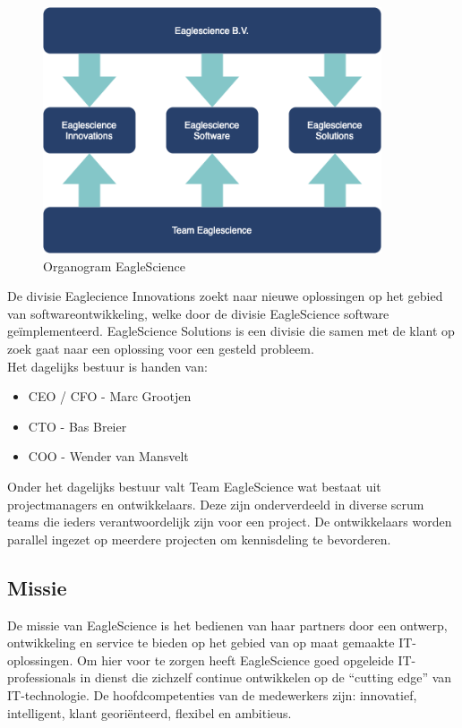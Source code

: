 \begin{figure}[bth]
\myfloatalign
\includegraphics[width=10cm]{gfx/organogram}
\caption{Organogram EagleScience}
\label{fig:EagleScience organogram}
\end{figure}
De divisie Eaglecience Innovations zoekt naar nieuwe oplossingen op het gebied van softwareontwikkeling, welke door de divisie EagleScience software geïmplementeerd. EagleScience Solutions is een divisie die samen met de klant op zoek gaat naar een oplossing voor een gesteld probleem.\\ %
Het dagelijks bestuur is handen van:
\begin{itemize}
\item CEO / CFO - Marc Grootjen
\item CTO - Bas Breier
\item COO - Wender van Mansvelt
\end{itemize}
Onder het dagelijks bestuur valt Team EagleScience wat bestaat uit projectmanagers en ontwikkelaars. Deze zijn onderverdeeld in diverse scrum teams die ieders verantwoordelijk zijn voor een project. De ontwikkelaars worden parallel ingezet op meerdere projecten om kennisdeling te bevorderen.

\subsection{Missie}\label{subsec:missie}

De missie van EagleScience is het bedienen van haar partners door een ontwerp, ontwikkeling en service te bieden op het gebied van op maat gemaakte IT-oplossingen. Om hier voor te zorgen heeft EagleScience goed opgeleide IT-professionals in dienst die zichzelf continue ontwikkelen op de “cutting edge” van IT-technologie. De hoofdcompetenties van de medewerkers zijn: innovatief, intelligent, klant georiënteerd, flexibel en ambitieus.

